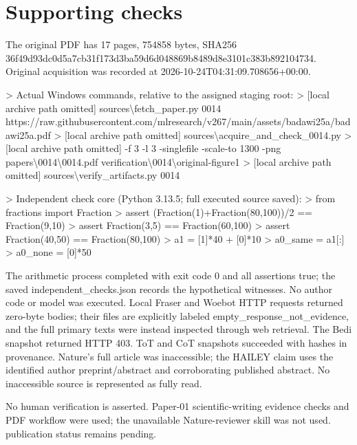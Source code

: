 \documentclass[10pt]{article}
\begin{document}
\section*{Supporting checks}
The original PDF has 17 pages, 754858 bytes, SHA256 36f49d93dc0d5a7cb31f173d3ba59d6d048869b8489d8e3101c383b892104734. Original acquisition was recorded at 2026-10-24T04:31:09.708656+00:00.\par
> Actual Windows commands, relative to the assigned staging root:
> [local archive path omitted] sources\textbackslash{}fetch\_paper.py 0014 https://raw.githubusercontent.com/mlresearch/v267/main/assets/badawi25a/badawi25a.pdf
> [local archive path omitted] sources\textbackslash{}acquire\_and\_check\_0014.py
> [local archive path omitted] -f 3 -l 3 -singlefile -scale-to 1300 -png papers\textbackslash{}0014\textbackslash{}0014.pdf verification\textbackslash{}0014\textbackslash{}original-figure1
> [local archive path omitted] sources\textbackslash{}verify\_artifacts.py 0014\par
> Independent check core (Python 3.13.5; full executed source saved):
> from fractions import Fraction
> assert (Fraction(1)+Fraction(80,100))/2 == Fraction(9,10)
> assert Fraction(3,5) == Fraction(60,100)
> assert Fraction(40,50) == Fraction(80,100)
> a1 = [1]*40 + [0]*10
> a0\_same = a1[:]
> a0\_none = [0]*50\par
The arithmetic process completed with exit code 0 and all assertions true; the saved independent\_checks.json records the hypothetical witnesses. No author code or model was executed. Local Fraser and Woebot HTTP requests returned zero-byte bodies; their files are explicitly labeled empty\_response\_not\_evidence, and the full primary texts were instead inspected through web retrieval. The Bedi snapshot returned HTTP 403. ToT and CoT snapshots succeeded with hashes in provenance. Nature’s full article was inaccessible; the HAILEY claim uses the identified author preprint/abstract and corroborating published abstract. No inaccessible source is represented as fully read.\par
No human verification is asserted. Paper-01 scientific-writing evidence checks and PDF workflow were used; the unavailable Nature-reviewer skill was not used. publication status remains pending.\par
\end{document}
